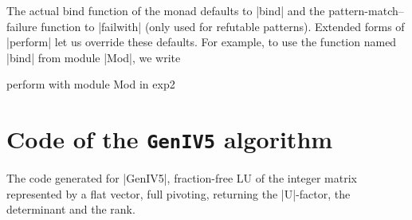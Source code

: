 \documentclass{elsart}
\begin{document}
The actual bind function of the monad defaults to |bind| and the
pattern-match--failure function to |failwith| (only used for refutable
patterns).  Extended forms of |perform| let us override these
defaults. For example, to use the function named 
|bind| from module |Mod|, we write
\begin{code}
        perform with module Mod in exp2
\end{code}

\section{Code of the \texttt{GenIV5} algorithm}
\label{app:code-GenIV5}
The code generated for |GenIV5|, fraction-free LU of the integer matrix
represented by a flat vector, full pivoting, returning the |U|-factor,
the determinant and the rank.
\end{document}
